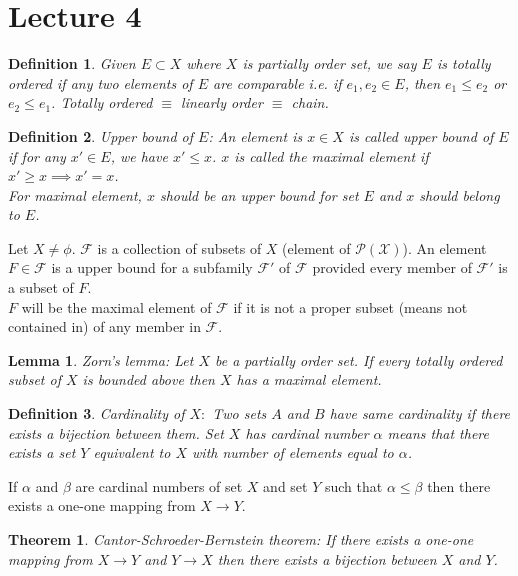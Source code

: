 \documentclass[12pt]{report}
\newtheorem{thm}{Theorem}
\newtheorem{lem}{Lemma}
\newtheorem{defn}{Definition}
\begin{document}
\section*{Lecture 4}
\begin{defn}
    Given $E \subset X$ where $X$ is partially order set, we say $E$ is totally ordered if any two elements of $E$ are comparable i.e. if $e_1,e_2 \in E$, then $e_1 \leq e_2$ or $e_2 \leq e_1$. Totally ordered $\equiv$ linearly order $\equiv$ chain.
\end{defn}
\begin{defn}
    Upper bound of $E$: An element is $x \in X$ is called upper bound of $E$ if for any $x' \in E$, we have $x' \leq x$. $x$ is called the maximal element if $x' \geq x \implies x' = x$.\\
    For maximal element, $x$ should be an upper bound for set $E$ and $x$ should belong to $E$.
\end{defn}
Let $X \neq \phi$. $\mathcal{F}$ is a collection of subsets of $X$ (element of $\mathcal{P(\text{X})}$). An element $F \in \mathcal{F}$ is a upper bound for a subfamily $\mathcal{F'}$ of $\mathcal{F}$ provided every member of $\mathcal{F'}$ is a subset of $F$.\\
$F$ will be the maximal element of $\mathcal{F}$ if it is not a proper subset (means not contained in) of any member in $\mathcal{F}$. 
\begin{lem}
    Zorn's lemma: Let $X$ be a partially order set. If every totally ordered subset of $X$ is bounded above then $X$ has a maximal element.
\end{lem}
\begin{defn}
    Cardinality of $X:$ Two sets $A$ and $B$ have same cardinality if there exists a bijection between them. Set $X$ has cardinal number $\alpha$ means that there exists a set $Y$ equivalent to $X$ with number of elements equal to $\alpha$.   
\end{defn}
If $\alpha$ and $\beta$ are cardinal numbers of set $X$ and set $Y$ such that $\alpha \leq \beta$ then there exists a one-one mapping from $X \to Y$.
\begin{thm}
    Cantor-Schroeder-Bernstein theorem: If there exists a one-one mapping from $X \to Y$ and $Y \to X$ then there exists a bijection between $X$ and $Y$.
\end{thm}
\end{document}
